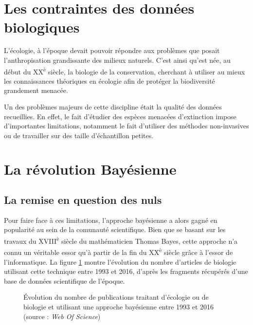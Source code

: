 \documentclass[11pt,twocolumn,twoside]{bopHomework}
\begin{document}
\section{Les contraintes des données biologiques}

L'écologie, à l'époque devait pouvoir répondre aux problèmes que posait
l'anthropisation grandissante des milieux naturels.
C'est ainsi qu'est née, au début du XX\textsuperscript{è} siècle, la biologie de
la conservation, cherchant à utiliser au mieux les connaissances théoriques en
écologie afin de protéger la biodiversité grandement menacée.

Un des problèmes majeurs de cette discipline était la qualité des données
recueillies.
En effet, le fait d'étudier des espèces menacées d'extinction impose
d'importantes limitations, notamment le fait d'utiliser des méthodes
non-invasives ou de travailler sur des taille d'échantillon petites.


\section{La révolution Bayésienne}
\subsection{La remise en question des nuls}

Pour faire face à ces limitations, l'approche bayésienne a alors gagné en
popularité au sein de la comunauté scientifique.
Bien que se basant sur les travaux du XVIII\textsuperscript{è} siècle du
mathématicien Thomas Bayes, cette approche n'a connu un véritable essor qu'à
partir de la fin du XX\textsuperscript{è} siècle grâce à l'essor de
l'informatique.
La figure \ref{fig:bibliometry} montre l'évolution du nombre d'articles de
biologie utilisant cette technique entre 1993 et 2016, d'après les fragments
récupérés d'une base de données scientifique de l'époque.

\begin{figure}[h]
  \centering{\graphfont}
  \caption{Évolution du nombre de publications traitant d'écologie ou de
    biologie et utilisant une approche bayésienne entre 1993 et 2016 (source :
    \textit{Web Of Science})}
  \label{fig:bibliometry}
\end{figure}
\end{document}
